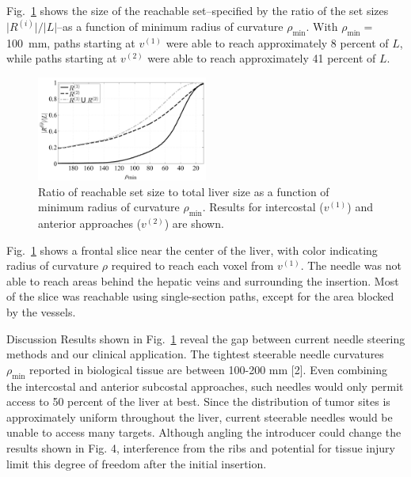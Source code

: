 Fig.~\ref{fig:ReachableSizeByRho} shows the size of the reachable set--specified by the ratio of the set sizes $\lvert R^{(i)} \rvert / \lvert L \rvert$--as a function of minimum radius of curvature $\rho_{\text{min}}$. With $\rho_{\text{min}} =$ 100~mm, paths starting at $v^{(1)}$ were able to reach approximately 8 percent of $L$, while paths starting at $v^{(2)}$ were able to reach approximately 41 percent of $L$. 

\begin{figure}[!t]
\centering
\includegraphics[width = 0.5\textwidth]{Images/Chapter3/ReachableSizeByRho/ReachableSizeByRho}%
\caption[Reachable set size as a function of $\rho_{\text{min}}$]{Ratio of reachable set size to total liver size as a function of minimum radius of curvature $\rho_{\text{min}}$. Results for intercostal ($v^{(1)}$) and anterior approaches ($v^{(2)}$) are shown.}
\label{fig:ReachableSizeByRho}
\end{figure}

Fig.~\ref{fig:ReachableSizeByRho} shows a frontal slice near the center of the liver, with color indicating radius of curvature $\rho$ required to reach each voxel from $v^{(1)}$. The needle was not able to reach areas behind the hepatic veins and surrounding the insertion. Most of the slice was reachable using single-section paths, except for the area blocked by the vessels.

Discussion
Results shown in Fig.~\ref{fig:ReachableSizeByRho} reveal the gap between current needle steering methods and our clinical application. The tightest steerable needle curvatures $\rho_{\text{min}}$ reported in biological tissue are between 100-200 mm [2]. Even combining the intercostal and anterior subcostal approaches, such needles would only permit access to 50 percent of the liver at best. Since the distribution of tumor sites is approximately uniform throughout the liver, current steerable needles would be unable to access many targets. Although angling the introducer could change the results shown in Fig. 4, interference from the ribs and potential for tissue injury limit this degree of freedom after the initial insertion. 

